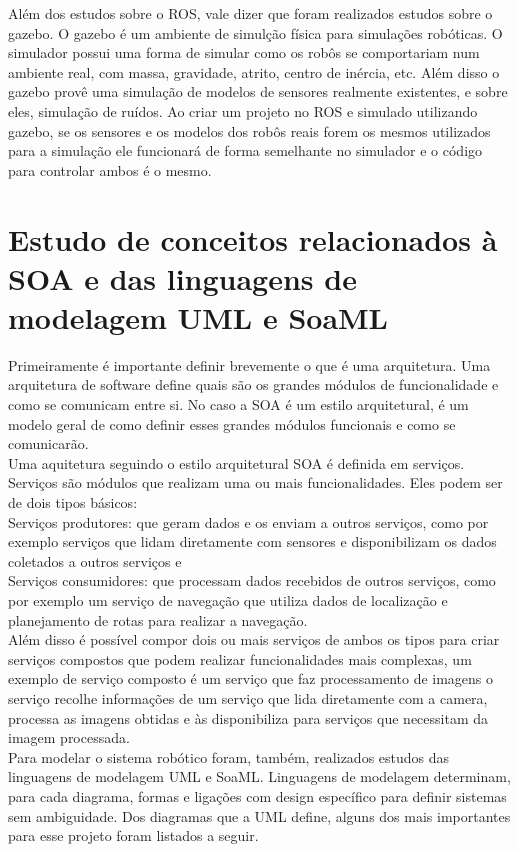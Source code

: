 \documentclass{article}
\begin{document}
Além dos estudos sobre o ROS, vale dizer que foram realizados estudos sobre o gazebo. O gazebo é um ambiente de simulção física para simulações robóticas. O simulador possui uma forma de simular como os robôs se comportariam num ambiente real, com massa, gravidade, atrito, centro de inércia, etc. Além disso o gazebo provê uma simulação de modelos de sensores realmente existentes, e sobre eles, simulação de ruídos. Ao criar um projeto no ROS e simulado utilizando gazebo, se os sensores e os modelos dos robôs reais forem os mesmos utilizados para a simulação ele funcionará de forma semelhante no simulador e o código para controlar ambos é o mesmo.\\

\section{Estudo de conceitos relacionados à SOA e das linguagens de modelagem UML e SoaML}
Primeiramente é importante definir brevemente o que é uma arquitetura. Uma arquitetura de software define quais são os grandes módulos de funcionalidade e como se comunicam entre si. No caso a SOA é um estilo arquitetural, é um modelo geral de como definir esses grandes módulos funcionais e como se comunicarão.\\
Uma aquitetura seguindo o estilo arquitetural SOA é definida em serviços. Serviços são módulos que realizam uma ou mais funcionalidades. Eles podem ser de dois tipos básicos:\\ 
Serviços produtores: que geram dados e os enviam a outros serviços, como por exemplo serviços que lidam diretamente com sensores e disponibilizam os dados coletados a outros serviços e\\
Serviços consumidores: que processam dados recebidos de outros serviços, como por exemplo um serviço de navegação que utiliza dados de localização e planejamento de rotas para realizar a navegação.\\
Além disso é possível compor dois ou mais serviços de ambos os tipos para criar serviços compostos que podem realizar funcionalidades mais complexas, um exemplo de serviço composto é um serviço que faz processamento de imagens o serviço recolhe informações de um serviço que lida diretamente com a camera, processa as imagens obtidas e às disponibiliza para serviços que necessitam da imagem processada.\\ 
Para modelar o sistema robótico foram, também, realizados estudos das linguagens de modelagem UML e SoaML. Linguagens de modelagem determinam, para cada diagrama, formas e ligações com design específico para definir sistemas sem ambiguidade. Dos diagramas que a UML define, alguns dos mais importantes para esse projeto foram listados a seguir.\\
\end{document}
